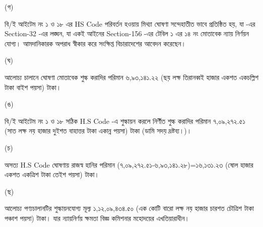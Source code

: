 \documentclass[12pt]{article}
\begin{document}
\thispagestyle{empty}
\noindent
\begin{minipage}[t]{0.05\linewidth}
(গ)
\end{minipage}
\begin{minipage}[t]{0.95\linewidth}
বি/ই আইটেম নং ১ ও ১৮ এর HS Code পরিবর্তন
হওয়ায় মিথ্যা ঘোষণা সন্দেহাতীত ভাবে প্রতিষ্ঠিত হয়,
যা {\tca} -এর
Section-32
-এর লঙ্ঘন, যা একই আইনের
Section-156
-এর টেবিল ১ এর ১৪ নং
মোতাবেক ন্যায় নির্ণয়ন যোগ্য।
আমদানিকারক অপরাধ স্বীকার করে সংক্ষিপ্ত বিচারাদেশের
আবেদন করেছেন।
\\
\end{minipage}
\begin{minipage}[t]{0.05\linewidth}
(ঘ)
\end{minipage}
\begin{minipage}[t]{0.95\linewidth}
আলোচ্য চালানে ঘোষণা মোতাবেক শুল্ক করাদির পরিমান
৬,৯৩,১৪১.২২
(ছয় লক্ষ তিরানব্বই হাজার একশত একচল্লিশ টাকা বাইশ পয়সা) টাকা।
\\
\end{minipage}
\begin{minipage}[t]{0.05\linewidth}
(ঙ)
\end{minipage}
\begin{minipage}[t]{0.95\linewidth}
বি/ই আইটেম নং ১ ও ১৮ সঠিক H.S Code -এ
শুল্কায়ন করলে নির্ণীত শুল্ক করাদির পরিমান
৭,০৯,২৭২.৫১
(সাত লক্ষ নয় হাজার দুইশত বাহাত্তর টাকা একান্ন পয়সা) টাকা (ডামি সদয় দ্রষ্টব্য।)।
\\
\end{minipage}
\begin{minipage}[t]{0.05\linewidth}
(চ)
\end{minipage}
\begin{minipage}[t]{0.95\linewidth}
অসত্য H.S Code ঘোষণায় রাজস্ব হানির পরিমান
(৭,০৯,২৭২.৫১-৬,৯৩,১৪১.২৮)=১৬,১৩১.২৩
(ষোল হাজার একশত একত্রিশ টাকা তেইশ পয়সা) টাকা।
\\
\end{minipage}
\begin{minipage}[t]{0.05\linewidth}
(ছ)
\end{minipage}
\begin{minipage}[t]{0.95\linewidth}
আলোচ্য পণ্যচালানটির শুল্কায়নযোগ্য মূল্য
১,১২,০৯,৪৩৪.৫০
(এক কোটি বারো লক্ষ নয় হাজার চারশত চৌত্রিশ টাকা পঞ্চাশ পয়সা) টাকা।
যার ন্যায়নির্ণয় ক্ষমতা বিজ্ঞ কমিশনার মহোদয়ের
এখতিয়ারাধীন।
\\
\end{minipage}
\end{document}
